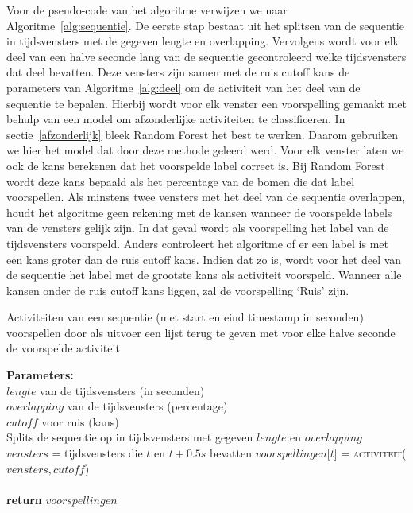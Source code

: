\documentclass{article}
\begin{document}
Voor de pseudo-code van het algoritme verwijzen we naar Algoritme~\ref{alg:sequentie}. De eerste stap bestaat uit het splitsen van de sequentie in tijdsvensters met de gegeven lengte en overlapping. Vervolgens wordt voor elk deel van een halve seconde lang van de sequentie gecontroleerd welke tijdsvensters dat deel bevatten. Deze vensters zijn samen met de ruis cutoff kans de parameters van Algoritme~\ref{alg:deel} om de activiteit van het deel van de sequentie te bepalen. Hierbij wordt voor elk venster een voorspelling gemaakt met behulp van een model om afzonderlijke activiteiten te classificeren. In sectie~\ref{afzonderlijk} bleek Random Forest het best te werken. Daarom gebruiken we hier het model dat door deze methode geleerd werd. Voor elk venster laten we ook de kans berekenen dat het voorspelde label correct is. Bij Random Forest wordt deze kans bepaald als het percentage van de bomen die dat label voorspellen. %
Als minstens twee vensters met het deel van de sequentie overlappen, houdt het algoritme geen rekening met de kansen wanneer de voorspelde labels van de vensters gelijk zijn. In dat geval wordt als voorspelling het label van de tijdsvensters voorspeld. Anders controleert het algoritme of er een label is met een kans groter dan de ruis cutoff kans. Indien dat zo is, wordt voor het deel van de sequentie het label met de grootste kans als activiteit voorspeld. Wanneer alle kansen onder de ruis cutoff kans liggen, zal de voorspelling `Ruis' zijn.

\begin{algorithm}
  \caption{Activiteiten van een sequentie (met start en eind timestamp in seconden) voorspellen door als uitvoer een lijst terug te geven met voor elke halve seconde de voorspelde activiteit}
  \label{alg:sequentie}
  \begin{algorithmic}[0]
    \State \textbf{Parameters:}\\
    $lengte$ van de tijdsvensters (in seconden) \\
    $overlapping$ van de tijdsvensters (percentage) \\
    $cutoff$ voor ruis (kans) \\
    \State Splits de sequentie op in tijdsvensters met gegeven $lengte$ en $overlapping$ \\
      \State $vensters$ = tijdsvensters die $t$ en $t+0.5s$ bevatten
      \State $voorspellingen$[$t$] = \textsc{activiteit}($vensters,cutoff$) \\
    \EndFor \\
    \State \textbf{return} $voorspellingen$
  \end{algorithmic}
\end{algorithm}
\end{document}
